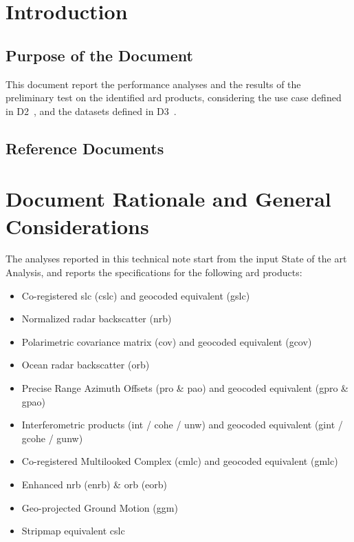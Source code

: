 \section{Introduction}

\subsection{Purpose of the Document}
This document report the performance analyses and the results of the preliminary test on the identified \acs{ard} products, considering the use case defined in D2~\cite{D2}, and the datasets defined in D3~\cite{D3}. 

\subsection{Reference Documents}

\renewcommand{\refname}{}
\vspace{-2em}



\clearpage

\section{Document Rationale and General Considerations}
The analyses reported in this technical note start from the input State of the art Analysis, and reports the specifications for the following \acs{ard} products:
    \begin{itemize}
        \item Co-registered \acs{slc} (\acs{cslc}) and geocoded equivalent (\acs{gslc})
        \item Normalized radar backscatter (\acs{nrb})
        \item Polarimetric covariance matrix (\acs{cov}) and geocoded equivalent (\acs{gcov})
        \item Ocean radar backscatter (\acs{orb})
        \item Precise Range Azimuth Offsets (\acs{pro} \& \acs{pao}) and geocoded equivalent (\acs{gpro} \& \acs{gpao})
        \item Interferometric products (\acs{int} / \acs{cohe} / \acs{unw}) and geocoded equivalent (\acs{gint} / \acs{gcohe} / \acs{gunw})
        \item Co-registered Multilooked Complex (\acs{cmlc}) and geocoded equivalent (\acs{gmlc})
        \item Enhanced \acs{nrb} (\acs{enrb}) \& \acs{orb} (\acs{eorb})
        \item Geo-projected Ground Motion (\acs{ggm})
        \item Stripmap equivalent \acs{cslc}
    \end{itemize}

